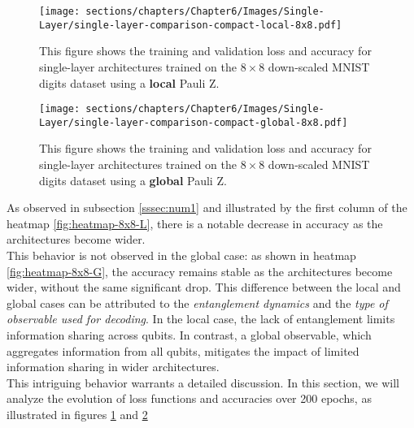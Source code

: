 \begin{figure}[h]
    \centering
    \texttt{[image: sections/chapters/Chapter6/Images/Single-Layer/single-layer-comparison-compact-local-8x8.pdf]}
    \caption{This figure shows the training and validation loss and accuracy for single-layer architectures
    trained on the $8\times8$ down-scaled MNIST digits dataset using a \textbf{local} Pauli Z.}
    \label{fig:Single-loss-local}
\end{figure}

\begin{figure}[h]
    \centering
    \texttt{[image: sections/chapters/Chapter6/Images/Single-Layer/single-layer-comparison-compact-global-8x8.pdf]}
    \caption{This figure shows the training and validation loss and accuracy for single-layer architectures
    trained on the $8\times8$ down-scaled MNIST digits dataset using a \textbf{global} Pauli Z.}
    \label{fig:Single-loss-global}
\end{figure}


As observed in subsection \ref{sssec:num1} and illustrated by the first column of the heatmap 
\ref{fig:heatmap-8x8-L}, there is a notable decrease in accuracy as the architectures become wider.\\
This behavior is not observed in the global case: as shown in heatmap \ref{fig:heatmap-8x8-G}, 
the accuracy remains stable as the architectures become wider, without the same significant drop.
This difference between the local and global cases can be attributed to the \textit{entanglement dynamics} and 
the \textit{type of observable used for decoding}. 
In the local case, the lack of entanglement limits information sharing across qubits. 
In contrast, a global observable, which aggregates information from all qubits, mitigates the 
impact of limited information sharing in wider architectures.\\

This intriguing behavior warrants a detailed discussion. 
In this section, we will analyze the evolution of loss functions and accuracies over 200 epochs, 
as illustrated in figures \ref{fig:Single-loss-local} and \ref{fig:Single-loss-global}






